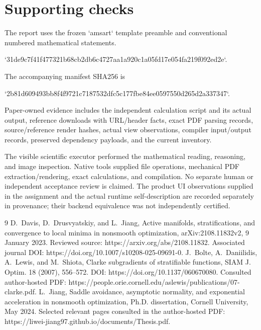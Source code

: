 \documentclass[10pt]{article}
\begin{document}
\section*{Supporting checks}
The report uses the frozen `amsart` template preamble and conventional numbered mathematical statements.\par
`31de9c7f41f477321b68cb2db6c4727aa1a920c1a05fd17e054fa219f092ed2e`.\par
The accompanying manifest SHA256 is\par
`2b81d609493bb8f4f9721c7187532dfc5c177fbe84ee0597550d265d2a337347`.\par
Paper-owned evidence includes the independent calculation script and its actual output, reference downloads with URL/header facts, exact PDF parsing records, source/reference render hashes, actual view observations, compiler input/output records, preserved dependency payloads, and the current inventory.\par
The visible scientific executor performed the mathematical reading, reasoning, and image inspection. Native tools supplied file operations, mechanical PDF extraction/rendering, exact calculations, and compilation. No separate human or independent acceptance review is claimed. The product UI observations supplied in the assignment and the actual runtime self-description are recorded separately in provenance; their backend equivalence was not independently certified.\par
9 D. Davis, D. Drusvyatskiy, and L. Jiang, Active manifolds, stratifications, and convergence to local minima in nonsmooth optimization, arXiv:2108.11832v2, 9 January 2023. Reviewed source: https://arxiv.org/abs/2108.11832. Associated journal DOI: https://doi.org/10.1007/s10208-025-09691-0. J. Bolte, A. Daniilidis, A. Lewis, and M. Shiota, Clarke subgradients of stratifiable functions, SIAM J. Optim. 18 (2007), 556–572. DOI: https://doi.org/10.1137/060670080. Consulted author-hosted PDF: https://people.orie.cornell.edu/aslewis/publications/07-clarke.pdf. L. Jiang, Saddle avoidance, asymptotic normality, and exponential acceleration in nonsmooth optimization, Ph.D. dissertation, Cornell University, May 2024. Selected relevant pages consulted in the author-hosted PDF: https://liwei-jiang97.github.io/documents/Thesis.pdf.\par
\end{document}
